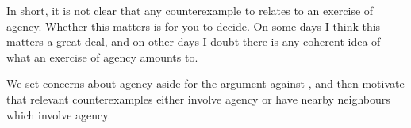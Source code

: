 \begin{note}
  In short, it is not clear that any counterexample to \issueInclusion{} relates to an exercise of agency.
  Whether this matters is for you to decide.
  On some days I think this matters a great deal, and on other days I doubt there is any coherent idea of what an exercise of agency amounts to.

  We set concerns about agency aside for the argument against \issueInclusion{}, and then motivate that relevant counterexamples either involve agency or have nearby neighbours which involve agency.
\end{note}







